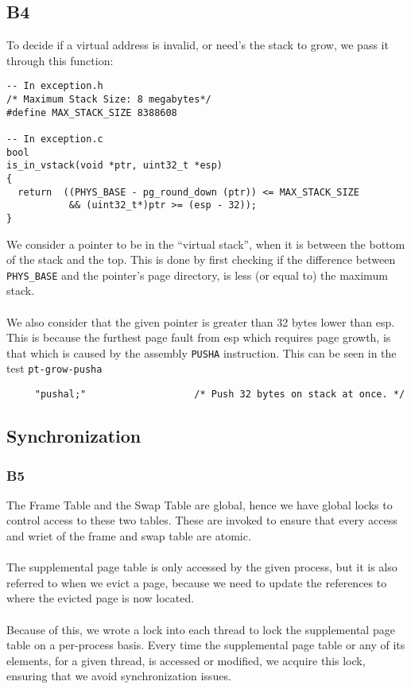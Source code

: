 \documentclass[a4wide, 11pt]{article}
\newcommand{\tx}{\texttt}
\begin{document}
\subsection{B4}

To decide if a virtual address is invalid, or need's the stack to grow, we pass it through this function:
\begin{verbatim}
-- In exception.h
/* Maximum Stack Size: 8 megabytes*/
#define MAX_STACK_SIZE 8388608

-- In exception.c
bool
is_in_vstack(void *ptr, uint32_t *esp)
{
  return  ((PHYS_BASE - pg_round_down (ptr)) <= MAX_STACK_SIZE
           && (uint32_t*)ptr >= (esp - 32));
}
\end{verbatim}

We consider a pointer to be in the ``virtual stack'', when it is between the bottom of the stack and the top. This is done by first checking if the difference between \tx{PHYS\_BASE} and the pointer's page directory, is less (or equal to) the maximum stack.\\
\\
We also consider that the given pointer is greater than 32 bytes lower than esp. This is because the furthest page fault from esp which requires page growth, is that which is caused by the assembly \tx{PUSHA} instruction. This can be seen in the test \tx{pt-grow-pusha}

\begin{verbatim}
     "pushal;"                   /* Push 32 bytes on stack at once. */
\end{verbatim}

\subsection{Synchronization}
\subsubsection{B5}

The Frame Table and the Swap Table are global, hence we have global locks to control access to these two tables. These are invoked to ensure that every access and wriet of the frame and swap table are atomic.\\
\\
The supplemental page table is only accessed by the given process, but it is also referred to when we evict a page, because we need to update the references to where the evicted page is now located.\\
\\
Because of this, we wrote a lock into each thread to lock the supplemental page table on a per-process basis. Every time the supplemental page table or any of its elements, for a given thread, is accessed or modified, we acquire this lock, ensuring that we avoid synchronization issues.
\end{document}
